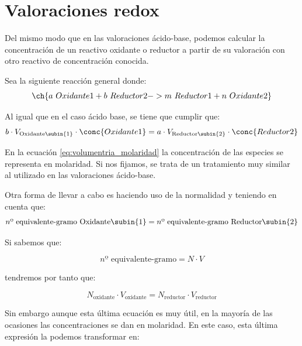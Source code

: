     \section{Valoraciones redox}\label{sec:valoraciones-redox}

    Del mismo modo que en las valoraciones ácido-base, podemos calcular la concentración de un reactivo oxidante o reductor a partir de su valoración con otro reactivo de concentración conocida.

    Sea la siguiente reacción general donde:
    \begin{equation*}
        \ch{a\ Oxidante1 + b\ Reductor2 -> m\ Reductor1 + n\ Oxidante2}
    \end{equation*}

    Al igual que en el caso ácido base, se tiene que cumplir que:
    \begin{equation}
        b\cdot V_{\text{Oxidante\subin{1}}}\cdot \conc{Oxidante1} = a\cdot V_{\text{Reductor\subin{2}}}\cdot \conc{Reductor2}\label{eq:volumentria_molaridad}
    \end{equation}

    En la ecuación \eqref{eq:volumentria_molaridad} la concentración de las especies se representa en molaridad.
    Si nos fijamos, se trata de un tratamiento muy similar al utilizado en las valoraciones ácido-base.

    Otra forma de llevar a cabo es haciendo uso de la normalidad y teniendo en cuenta que:
    \begin{equation*}
        n\text{º equivalente-gramo Oxidante\subin{1}} = n\text{º equivalente-gramo Reductor\subin{2}}
    \end{equation*}

    Si sabemos que:

    \begin{equation*}
        n\text{º equivalente-gramo} = N\cdot V
    \end{equation*}

    tendremos por tanto que:

    \begin{equation*}
        N_{\text{oxidante}}\cdot V_ {\text{oxidante}} = N_{\text{reductor}}\cdot V_ {\text{reductor}}
    \end{equation*}

    Sin embargo aunque esta última ecuación es muy útil, en la mayoría de las ocasiones las concentraciones se dan en molaridad.
    En este caso, esta última expresión la podemos transformar en:

